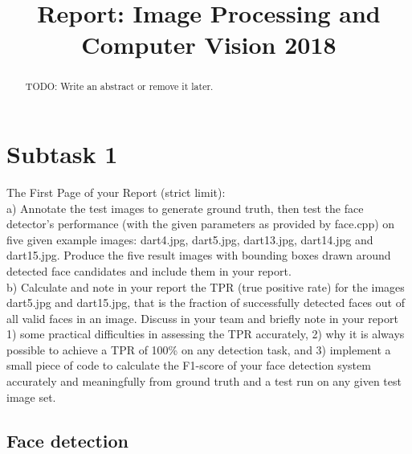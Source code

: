 \documentclass[conference]{IEEEtran}
\begin{document}
\title{Report: Image Processing and Computer Vision 2018}

\author{
\and
{}
}

\maketitle

\begin{abstract}TODO: Write an abstract or remove it later.
\end{abstract}

\section{Subtask 1}

The First Page of your Report (strict limit):\\
a) Annotate the test images to generate ground truth, then
test the face detector’s performance (with the given
parameters as provided by face.cpp) on five given example
images: dart4.jpg, dart5.jpg, dart13.jpg, dart14.jpg and
dart15.jpg. Produce the five result images with bounding
boxes drawn around detected face candidates and include
them in your report. \\
b) Calculate and note in your report the TPR (true positive
rate) for the images dart5.jpg and dart15.jpg, that is the
fraction of successfully detected faces out of all valid faces
in an image. Discuss in your team and briefly note in your
report 1) some practical difficulties in assessing the TPR
accurately, 2) why it is always possible to achieve a TPR of
100\% on any detection task, and 3) implement a small
piece of code to calculate the F1-score of your face
detection system accurately and meaningfully from
ground truth and a test run on any given test image set.

\subsection{Face detection}
\end{document}
